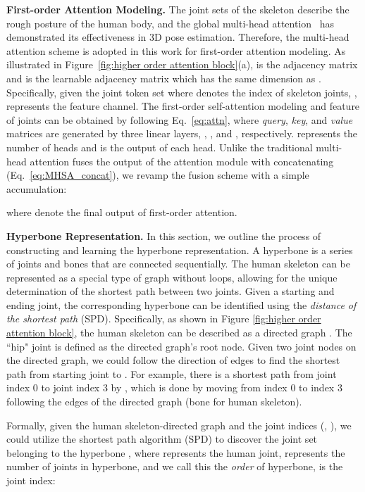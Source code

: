 \documentclass{article}
\begin{document}
\noindent \textbf{First-order Attention Modeling.} 
The joint sets of the skeleton describe the rough posture of the human body, and the global multi-head attention~\cite{ZhangCVPR22MixSTE} has demonstrated its effectiveness in 3D pose estimation. Therefore, the multi-head attention scheme is adopted in this work for first-order attention modeling. As illustrated in Figure~\ref{fig:higher order attention block}(a),  is the adjacency matrix and   is the learnable adjacency matrix which has the same dimension as . Specifically, given the joint token set  where  denotes the index of skeleton joints, ,  represents the feature channel. The first-order self-attention modeling and feature of joints can be obtained by following Eq.~\ref{eq:attn}, where \textit{query}, \textit{key}, and \textit{value} matrices are generated by three linear layers, , , and , respectively.  represents the number of heads and  is the output of each head. Unlike the traditional multi-head attention fuses the output of the attention module with concatenating (Eq.~\ref{eq:MHSA_concat}), we revamp the fusion scheme with a simple accumulation:

where  denote the final output of first-order attention.

\noindent \textbf{Hyperbone Representation.} In this section, we outline the process of constructing and learning the hyperbone representation. A hyperbone is a series of joints and bones that are connected sequentially. The human skeleton can be represented as a special type of graph without loops, allowing for the unique determination of the shortest path between two joints. Given a starting and ending joint, the corresponding hyperbone can be identified using the \textit{distance of the shortest path} (SPD). Specifically, as shown in Figure \ref{fig:higher order attention block}, the human skeleton can be described as a directed graph . The ``hip" joint is defined as the directed graph's root node. Given two joint nodes on the directed graph, we could follow the direction of edges to find the shortest path from starting joint  to . For example, there is a shortest path from joint index 0 to joint index 3 by \text{[0, 1, 2, 3]}, which is done by moving from index 0 to index 3 following the edges of the directed graph (bone for human skeleton). 


Formally, given the human skeleton-directed graph  and the  joint indices (, ), we could utilize the shortest path algorithm (SPD) to discover the joint set belonging to the hyperbone , where  represents the human joint,  represents the number of joints in hyperbone, and we call this the \textit{order} of hyperbone,  is the joint index:
\end{document}
